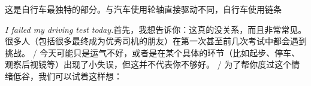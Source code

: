 \begin{multicols}{2}
这\allowbreak{}是\allowbreak{}自\allowbreak{}行\allowbreak{}车\allowbreak{}最\allowbreak{}独\allowbreak{}特\allowbreak{}的\allowbreak{}部\allowbreak{}\allowbreak{}分\allowbreak{}。\allowbreak{}与\allowbreak{}汽\allowbreak{}车\allowbreak{}使\allowbreak{}用\allowbreak{}轮\allowbreak{}轴\allowbreak{}直\allowbreak{}\allowbreak{}接\allowbreak{}驱\allowbreak{}动\allowbreak{}不\allowbreak{}同\allowbreak{}，\allowbreak{}自\allowbreak{}行\allowbreak{}车\allowbreak{}使\allowbreak{}\allowbreak{}用\allowbreak{}链\allowbreak{}条\allowbreak{}\par\noindent\textit{I failed my driving test today.}\enspace 首\allowbreak{}先\allowbreak{}，\allowbreak{}我\allowbreak{}想\allowbreak{}告\allowbreak{}诉\allowbreak{}你\allowbreak{}：\allowbreak{}这\allowbreak{}\allowbreak{}真\allowbreak{}的\allowbreak{}没\allowbreak{}关\allowbreak{}系\allowbreak{}，\allowbreak{}而\allowbreak{}且\allowbreak{}非\allowbreak{}常\allowbreak{}\allowbreak{}常\allowbreak{}见\allowbreak{}。\allowbreak{} 很\allowbreak{}多\allowbreak{}人\allowbreak{}（\allowbreak{}包\allowbreak{}括\allowbreak{}很\allowbreak{}多\allowbreak{}最\allowbreak{}终\allowbreak{}\allowbreak{}成\allowbreak{}为\allowbreak{}优\allowbreak{}秀\allowbreak{}司\allowbreak{}机\allowbreak{}的\allowbreak{}朋\allowbreak{}友\allowbreak{}）\allowbreak{}\allowbreak{}在\allowbreak{}第\allowbreak{}一\allowbreak{}次\allowbreak{}甚\allowbreak{}至\allowbreak{}前\allowbreak{}几\allowbreak{}次\allowbreak{}考\allowbreak{}\allowbreak{}试\allowbreak{}中\allowbreak{}都\allowbreak{}会\allowbreak{}遇\allowbreak{}到\allowbreak{}挑\allowbreak{}战\allowbreak{}。\allowbreak{} / 今\allowbreak{}天\allowbreak{}可\allowbreak{}能\allowbreak{}只\allowbreak{}是\allowbreak{}运\allowbreak{}气\allowbreak{}不\allowbreak{}好\allowbreak{}\allowbreak{}，\allowbreak{}或\allowbreak{}者\allowbreak{}是\allowbreak{}在\allowbreak{}某\allowbreak{}个\allowbreak{}具\allowbreak{}体\allowbreak{}的\allowbreak{}\allowbreak{}环\allowbreak{}节\allowbreak{}（\allowbreak{}比\allowbreak{}如\allowbreak{}起\allowbreak{}步\allowbreak{}、\allowbreak{}停\allowbreak{}车\allowbreak{}\allowbreak{}、\allowbreak{}观\allowbreak{}察\allowbreak{}后\allowbreak{}视\allowbreak{}镜\allowbreak{}等\allowbreak{}）\allowbreak{}出\allowbreak{}现\allowbreak{}\allowbreak{}了\allowbreak{}小\allowbreak{}失\allowbreak{}误\allowbreak{}，\allowbreak{}但\allowbreak{}这\allowbreak{}并\allowbreak{}不\allowbreak{}代\allowbreak{}\allowbreak{}表\allowbreak{}你\allowbreak{}不\allowbreak{}够\allowbreak{}好\allowbreak{}。\allowbreak{} / 为\allowbreak{}了\allowbreak{}帮\allowbreak{}你\allowbreak{}度\allowbreak{}过\allowbreak{}这\allowbreak{}个\allowbreak{}情\allowbreak{}绪\allowbreak{}\allowbreak{}低\allowbreak{}谷\allowbreak{}，\allowbreak{}我\allowbreak{}们\allowbreak{}可\allowbreak{}以\allowbreak{}试\allowbreak{}着\allowbreak{}这\allowbreak{}\allowbreak{}样\allowbreak{}想\allowbreak{}：\allowbreak{}\par\medskip

\end{multicols}
